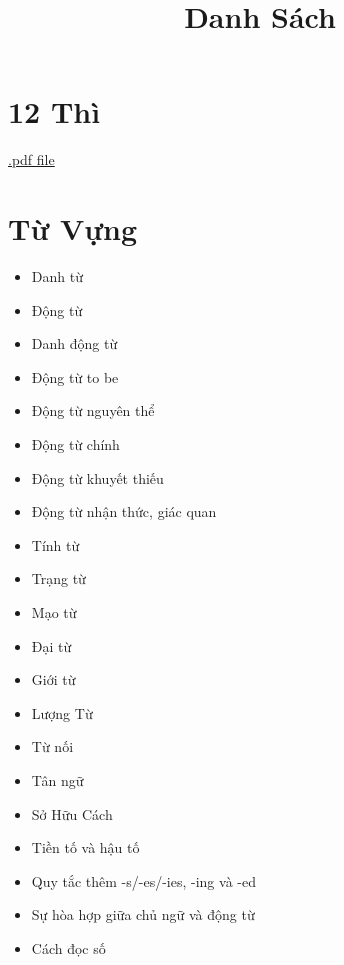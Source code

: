 \title{\Huge \textbf{Danh Sách}}
\maketitle
\tableofcontents

\chapter{12 Thì}
\href{https://github.com/theslime016/english-project/blob/main/english-project-release-files/12Tenses.pdf}
{.pdf file}
\chapter{Từ Vựng}
\begin{multicols*}{2}
\begin{itemize}
    \item Danh từ
	\item Động từ
	\item Danh động từ
	\item Động từ to be
	\item Động từ nguyên thể
	\item Động từ chính
	\item Động từ khuyết thiếu
	\item Động từ nhận thức, giác quan
	\item Tính từ
	\item Trạng từ
	\item Mạo từ
	\item Đại từ
	\item Giới từ
	\item Lượng Từ
	\item Từ nối
	\item Tân ngữ
	\item Sở Hữu Cách
	\item Tiền tố và hậu tố
	\item Quy tắc thêm -s/-es/-ies, -ing và -ed
	\item Sự hòa hợp giữa chủ ngữ và động từ
	\item Cách đọc số
\end{itemize}
\end{multicols*}

